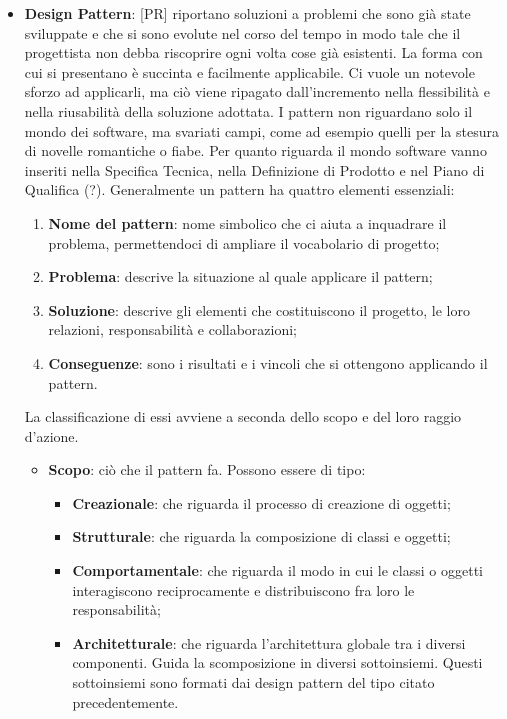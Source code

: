 \begin{itemize}
	\item \textbf{Design Pattern}: [PR] riportano soluzioni a problemi che sono già state sviluppate e che si sono evolute nel corso del tempo in modo tale che il progettista non debba riscoprire ogni volta cose già esistenti. La forma con cui si presentano è succinta e facilmente applicabile. Ci vuole un notevole sforzo ad applicarli, ma ciò viene ripagato dall'incremento nella flessibilità e nella riusabilità della soluzione adottata. \newline
	I pattern non riguardano solo il mondo dei software, ma svariati campi, come ad esempio quelli per la stesura di novelle romantiche o fiabe. \newline
	Per quanto riguarda il mondo software vanno inseriti nella Specifica Tecnica, nella Definizione di Prodotto e nel Piano di Qualifica (?). \newline
	Generalmente un pattern ha quattro elementi essenziali:
		\begin{enumerate}
			\item \textbf{Nome del pattern}: nome simbolico che ci aiuta a inquadrare il problema, permettendoci di ampliare il vocabolario di progetto;
			\item \textbf{Problema}: descrive la situazione al quale applicare il pattern;
			\item \textbf{Soluzione}: descrive gli elementi che costituiscono il progetto, le loro relazioni, responsabilità e collaborazioni;
			\item \textbf{Conseguenze}: sono i risultati e i vincoli che si ottengono applicando il pattern.
		\end{enumerate}
		\noindent
	La classificazione di essi avviene a seconda dello scopo e del loro raggio d'azione.
		\begin{itemize}
			\item \textbf{Scopo}: ciò che il pattern fa. Possono essere di tipo:
				\begin{itemize}
					\item \textbf{Creazionale}: che riguarda il processo di creazione di oggetti;
					\item \textbf{Strutturale}: che riguarda la composizione di classi e oggetti;
					\item \textbf{Comportamentale}: che riguarda il modo in cui le classi o oggetti interagiscono reciprocamente e distribuiscono fra loro le responsabilità;
					\item \textbf{Architetturale}: che riguarda l'architettura globale tra i diversi componenti. Guida la scomposizione in diversi sottoinsiemi. Questi sottoinsiemi sono formati dai design pattern del tipo citato precedentemente.

\end{itemize}
\end{itemize}
\end{itemize}
